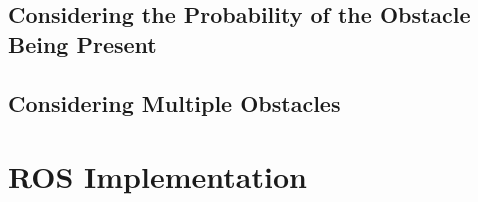 \documentclass[a4paper,12pt]{article}
\begin{document}
		\subsection{Considering the Probability of the Obstacle Being Present}

		\subsection{Considering Multiple Obstacles}

	
	\section{ROS Implementation}

		

	
	
	


	\newpage
	\appendix
	\appendixpage
	\addappheadtotoc
	
\end{document}
